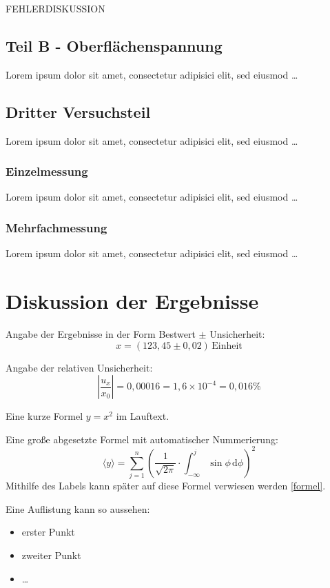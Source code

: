 \documentclass[11pt,a4paper]{article}
\begin{document}
FEHLERDISKUSSION

\subsection{Teil B - Oberfl\"achenspannung}
Lorem ipsum dolor sit amet, consectetur adipisici elit, sed eiusmod \dots

\subsection{Dritter Versuchsteil}
Lorem ipsum dolor sit amet, consectetur adipisici elit, sed eiusmod \dots

\subsubsection{Einzelmessung}
Lorem ipsum dolor sit amet, consectetur adipisici elit, sed eiusmod \dots

\subsubsection{Mehrfachmessung}
\label{mehrfachmessung}
Lorem ipsum dolor sit amet, consectetur adipisici elit, sed eiusmod \dots



\section{Diskussion der Ergebnisse}
\label{diskussion}

Angabe der Ergebnisse in der Form Bestwert $\pm$ Unsicherheit: 
\[ 
 x = (123{,}45 \pm 0{,}02)\,\text{Einheit}
\]

Angabe der relativen Unsicherheit: 
\[
 \left| \frac{u_x}{x_0} \right| = 0{,}00016 = 1{,}6\times 10^{-4} = 0{,}016\%
\]

Eine kurze Formel $y=x^2$ im Lauftext. 

Eine große abgesetzte Formel mit automatischer Nummerierung: 
\begin{equation}
 \langle y \rangle = \sum_{j=1}^{n}{ \left( \frac{1}{\sqrt{2\pi}} \cdot \int_{-\infty}^{j}{ \sin{\phi} \,\text{d}\phi} \right)^2 } 
\label{formel}
\end{equation}
Mithilfe des Labels kann später auf diese Formel verwiesen werden \eqref{formel}.

Eine Auflistung kann so aussehen: 
\begin{itemize}
	\item erster Punkt
	\item zweiter Punkt
	\item \dots
\end{itemize}
	 
\end{document}
